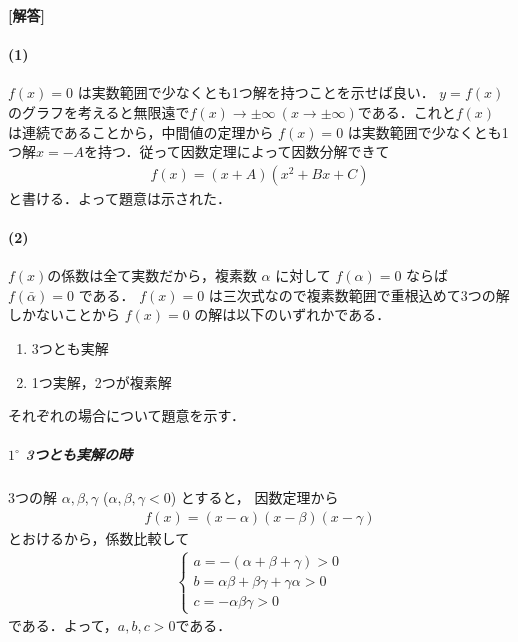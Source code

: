 \documentclass[../../main.tex]{subfiles}
\begin{document}
\begin{oframed}
  
\end{oframed}

{\bf [解答]}

\paragraph{(1)}

$f(x)=0$ は実数範囲で少なくとも1つ解を持つことを示せば良い．
$y=f(x)$ のグラフを考えると無限遠で$f(x) \to \pm \infty \ (x \to \pm \infty)$である．これと$f(x)$ は連続であることから，中間値の定理から $f(x)=0$ は実数範囲で少なくとも1つ解$x=-A$を持つ．従って因数定理によって因数分解できて
\begin{align}
  f(x) = (x+A)(x^2+Bx+C)
\end{align}
と書ける．よって題意は示された．

\paragraph{(2)}

$f(x)$の係数は全て実数だから，複素数 $\alpha$ に対して $f(\alpha)=0$ ならば $f(\bar{\alpha})=0$ である．
$f(x)=0$ は三次式なので複素数範囲で重根込めて3つの解しかないことから $f(x)=0$ の解は以下のいずれかである．

\begin{enumerate}
  \item[$1^\circ$] 3つとも実解
  \item[$2^\circ$] 1つ実解，2つが複素解
\end{enumerate}

それぞれの場合について題意を示す．

\subparagraph{$1^\circ$ 3つとも実解の時}

3つの解 $\alpha, \beta, \gamma$ ($\alpha, \beta, \gamma < 0$) とすると，
因数定理から
\begin{align}
  f(x)=(x-\alpha)(x-\beta)(x-\gamma)
\end{align}
とおけるから，係数比較して
\begin{align}
  \begin{cases}
    a = -(\alpha+\beta+\gamma) > 0 \\
    b = \alpha\beta+\beta\gamma+\gamma\alpha  > 0 \\
    c = -\alpha\beta\gamma  > 0
  \end{cases}
\end{align}
である．よって，$a, b, c > 0$である．
\end{document}
